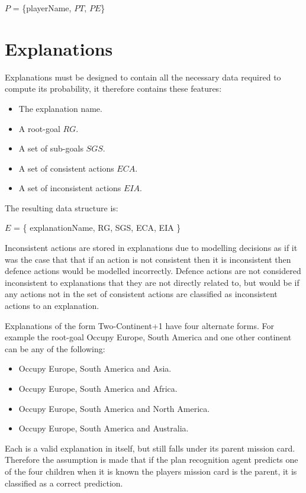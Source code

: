 \documentclass[parskip]{cs4rep}
\begin{document}
\centerline{
$P$ = \{playerName, $PT$, $PE$\}
}

\section{Explanations}

Explanations must be designed to contain all the necessary data required to compute its probability, it therefore contains these features:

\begin{itemize}
\item
The explanation name.
\item
A root-goal $RG$.
\item
A set of sub-goals $SGS$.
\item
A set of consistent actions $ECA$.
\item
A set of inconsistent actions $EIA$.
\end{itemize}

The resulting data structure is:\newline

\centerline{
$E$ = \{ explanationName, RG, SGS, ECA, EIA \}
}

Inconsistent actions are stored in explanations due to modelling decisions as if it was the case that that if an action is not consistent then it is inconsistent then defence actions would be modelled incorrectly. Defence actions are not considered inconsistent to explanations that they are not directly related to, but would be if any actions not in the set of consistent actions are classified as inconsistent actions to an explanation.

Explanations of the form Two-Continent+1 have four alternate forms. For example the root-goal Occupy Europe, South America and one other continent can be any of the following:

\begin{itemize}
\item
Occupy Europe, South America and Asia.
\item
Occupy Europe, South America and Africa.
\item
Occupy Europe, South America and North America.
\item
Occupy Europe, South America and Australia.
\end{itemize}

Each is a valid explanation in itself, but still falls under its parent mission card. Therefore the assumption is made that if the plan recognition agent predicts one of the four children when it is known the players mission card is the parent, it is classified as a correct prediction.
\end{document}

